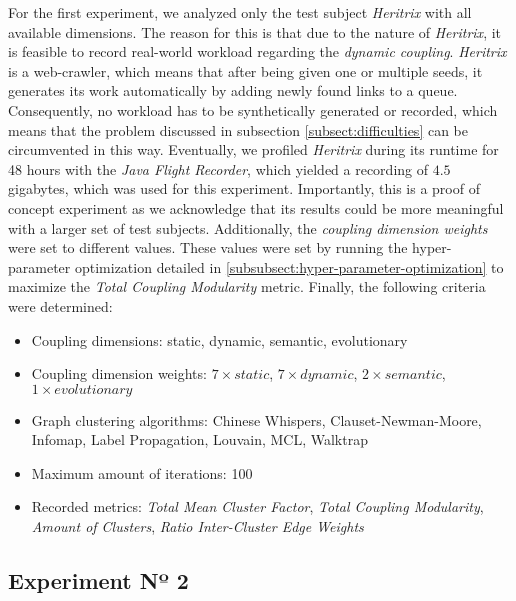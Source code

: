 \documentclass[12pt,a4paper]{report}
\begin{document}
For the first experiment, we analyzed only the
test subject \textit{Heritrix} with all available dimensions. The reason for
this is that due to the nature of \textit{Heritrix}, it is feasible to record
real\hyp world workload regarding the \textit{dynamic coupling}. \textit{
Heritrix} is a web\hyp crawler, which means that after being given one or
multiple seeds, it generates its work automatically by adding newly found links
to a queue. Consequently, no workload has to be synthetically generated or
recorded, which means that the problem discussed in subsection
\ref{subsect:difficulties} can be circumvented in this way.
Eventually, we profiled \textit{ Heritrix} during its runtime
for 48 hours with the \textit{Java Flight Recorder},
which yielded a recording of $4.5$ gigabytes, which was used for
this experiment. Importantly, this is a proof of concept experiment as we
acknowledge that its results could be more meaningful with a larger set of test
subjects. Additionally, the \textit{coupling dimension weights} were set to
different values. These values were set by running the hyper\hyp parameter
optimization detailed in \ref{subsubsect:hyper-parameter-optimization} to
maximize the \textit{Total Coupling Modularity} metric. Finally, the following
criteria were determined:
\begin{itemize}[noitemsep]
    \item Coupling dimensions: static, dynamic, semantic, evolutionary
    \item Coupling dimension weights: $7 \times static$, $7 \times dynamic$, $2 \times semantic$, $1 \times evolutionary$
    \item Graph clustering algorithms: Chinese Whispers, Clauset-Newman-Moore, Infomap, Label Propagation, Louvain, MCL, Walktrap
    \item Maximum amount of iterations: 100
    \item Recorded metrics:
    \textit{Total Mean Cluster Factor},
    \textit{Total Coupling Modularity},
    \textit{Amount of Clusters},
    \textit{Ratio Inter-Cluster Edge Weights}
\end{itemize}


\subsection{Experiment Nº 2}
\end{document}
